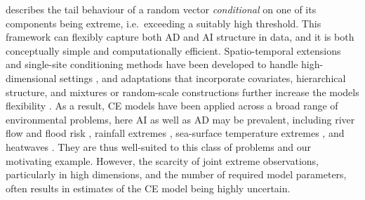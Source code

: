 \documentclass[12pt]{article}
\begin{document}
\citet{Heffernan2004} describes the tail behaviour of a random vector \emph{conditional} on one of its components being extreme, i.e.\ exceeding a suitably high threshold. 
This framework can flexibly capture both AD and AI structure in data, and it is both conceptually simple and computationally efficient.
Spatio-temporal extensions and single-site conditioning methods have been developed to handle high-dimensional settings \citep{Simpson2021, Wadsworth2022}, and adaptations that incorporate covariates, hierarchical structure, and mixtures or random-scale constructions further increase the models flexibility \citep{Tawn2018, Tendijck2023, Richards2023, Talento2025}.
As a result, CE models have been applied across a broad range of environmental problems, here AI as well as AD may be prevalent, including river flow and flood risk \citep{Gilleland2013, Jane2020}, rainfall extremes \citep{Richards2022}, sea-surface temperature extremes \citep{Simpson2023,Kakampakou2024}, and heatwaves \citep{Winter2016}.
They are thus well-suited to this class of problems and our motivating example.
However, the scarcity of joint extreme observations, particularly in high dimensions, and the number of required model parameters, often results in estimates of the CE model being highly uncertain. 
\end{document}
